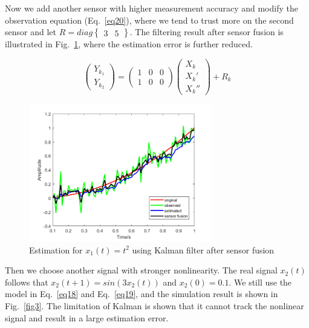 \documentclass[conference]{IEEEtran}
\begin{document}
	Now we add another sensor with higher measurement accuracy and modify the observation equation (Eq.~\ref{eq20}), where we tend to trust more on the second sensor and let $R=diag\begin{Bmatrix}
	3 &5
	\end{Bmatrix}$. The filtering result after sensor fusion is illustrated in Fig.~\ref{fig2}, where the estimation error is further reduced.
	
	\begin{equation}
	\begin{pmatrix}
	Y_{k_{1}}\\ 
	Y_{k_{2}}
	\end{pmatrix}=\begin{pmatrix}
	1 &0  &0 \\ 
	1 &0  & 0
	\end{pmatrix}\begin{pmatrix}
	X_{k}\\ 
	{X_{k}}'\\ 
	{X_{k}}''
	\end{pmatrix}+R_{k}
	\label{eq20}
	\end{equation}
	
	
	\begin{figure}[h]
		\centering
		\includegraphics[width=8cm]{fig2.png}
		\caption{Estimation for $x_{1}(t)=t^{2}$ using Kalman filter after sensor fusion}
		\label{fig2}
	\end{figure}

	Then we choose another signal with stronger nonlinearity. The real signal $x_{2}(t)$ follows that  $x_{2}(t+1)=sin(3x_{2}(t))$ and $x_{2}(0)=0.1$. We still use the model in Eq.~\ref{eq18} and Eq.~\ref{eq19}, and the simulation result is shown in Fig.~\ref{fig3}. The limitation of Kalman is shown that it cannot track the nonlinear signal and result in a large estimation error.
	
\end{document}

